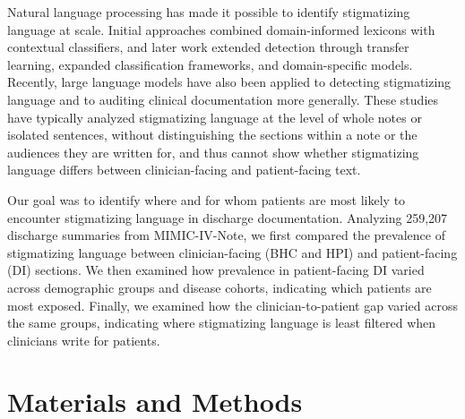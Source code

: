 \documentclass[unnumsec,webpdf,contemporary,large]{oup-authoring-template}
\begin{document}
Natural language processing has made it possible to identify stigmatizing language at scale.\cite{harrigian2023,xue2026,walker2025,scroggins2025} Initial approaches combined domain-informed lexicons with contextual classifiers,\cite{harrigian2023} and later work extended detection through transfer learning, expanded classification frameworks, and domain-specific models.\cite{xue2026,walker2025,scroggins2025} Recently, large language models have also been applied to detecting stigmatizing language and to auditing clinical documentation more generally.\cite{sethi2026,dahal2026} 
These studies have typically analyzed stigmatizing language at the level of whole notes or isolated sentences, without distinguishing the sections within a note or the audiences they are written for, and thus %
cannot show whether stigmatizing language differs between clinician-facing and patient-facing text.

Our goal was to identify where and for whom patients are most likely to encounter stigmatizing language in discharge documentation. Analyzing 259,207 discharge summaries from MIMIC-IV-Note,\cite{mimicnote2023,mimiciv2024} we first compared the prevalence of stigmatizing language between clinician-facing (BHC and HPI) and patient-facing (DI) sections. We then examined how prevalence in patient-facing DI varied across demographic groups and disease cohorts, indicating which patients are most exposed. Finally, we examined how the clinician-to-patient gap varied across the same groups, indicating where stigmatizing language is least filtered when clinicians write for patients.

\section{Materials and Methods}
\end{document}

